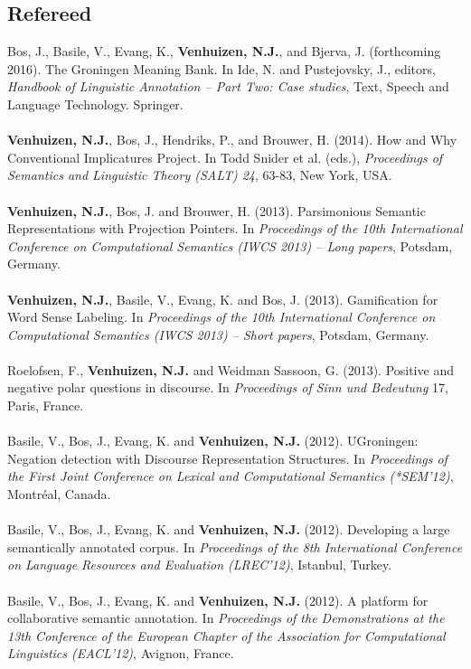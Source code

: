 \documentclass[a4paper,10pt]{article}
\begin{document}
\subsection*{Refereed}

\noindent
    Bos, J., Basile, V., Evang, K., \textbf{Venhuizen, N.J.}, and Bjerva, J.
    (forthcoming 2016). The Groningen Meaning Bank. In Ide, N. and Pustejovsky, J.,
    editors, \textit{Handbook of Linguistic Annotation -- Part Two: Case
    studies}, Text, Speech and Language Technology. Springer.\\
    \\
    \textbf{Venhuizen, N.J.}, Bos, J., Hendriks, P., and Brouwer, H. (2014).
    How and Why Conventional Implicatures Project. In Todd Snider et al.
    (eds.), \textit{Proceedings of Semantics and Linguistic Theory (SALT) 24},
    63-83, New York, USA.\\
    \\
    \textbf{Venhuizen, N.J.}, Bos, J. and Brouwer, H. (2013). Parsimonious 
    Semantic Representations with Projection Pointers. In \textit{Proceedings
    of the 10th International Conference on Computational Semantics (IWCS 2013)
    -- Long papers}, Potsdam, Germany.\\
    \\
    \textbf{Venhuizen, N.J.}, Basile, V., Evang, K. and Bos, J. (2013).
    Gamification for Word Sense Labeling. In \textit{Proceedings of the 10th 
    International Conference on Computational Semantics (IWCS 2013) --
    Short papers}, Potsdam, Germany.\\
    \\
    Roelofsen, F., \textbf{Venhuizen, N.J.} and Weidman Sassoon, G. (2013).
    Positive and negative polar questions in discourse. In \textit{Proceedings of
    Sinn und Bedeutung} 17, Paris, France.\\
    \\
    Basile, V., Bos, J., Evang, K. and \textbf{Venhuizen, N.J.} (2012). UGroningen:
    Negation detection with Discourse Representation Structures. In
    \textit{Proceedings of the First Joint Conference on Lexical and Computational
    Semantics (*SEM'12)}, Montr\'eal, Canada.\\
    \\
    Basile, V., Bos, J., Evang, K. and \textbf{Venhuizen, N.J.} (2012). Developing
    a large semantically annotated corpus. In \textit{Proceedings of the 8th
    International Conference on Language Resources and Evaluation (LREC'12)},
    Istanbul, Turkey.\\
    \\
    Basile, V., Bos, J., Evang, K. and \textbf{Venhuizen, N.J.} (2012). A platform
    for collaborative semantic annotation. In \textit{Proceedings of the
    Demonstrations at the 13th Conference of the European Chapter of the
    Association for Computational Linguistics (EACL'12)}, Avignon, France.
\end{document}
